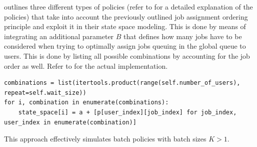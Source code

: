  outlines three different types of policies (refer to  for a detailed explanation of the policies) that take into account the previously outlined job assignment ordering principle and exploit it in their state space modeling. This is done by means of integrating an additional parameter $B$ that defines how many jobs have to be considered when trying to optimally assign jobs queuing in the global queue to users. This is done by listing all possible combinations by accounting for the job order as well. Refer to  for the actual implementation.

\begin{lstlisting}[caption=State space modeling by considering $B$ jobs from the global queue and integrating all possible combinations,label=lst:wz_combinations,style=CustomPython]
combinations = list(itertools.product(range(self.number_of_users), repeat=self.wait_size))
for i, combination in enumerate(combinations):
    state_space[i] = a + [p[user_index][job_index] for job_index, user_index in enumerate(combination)]
\end{lstlisting}

This approach effectively simulates batch policies with batch sizes $K>1$.